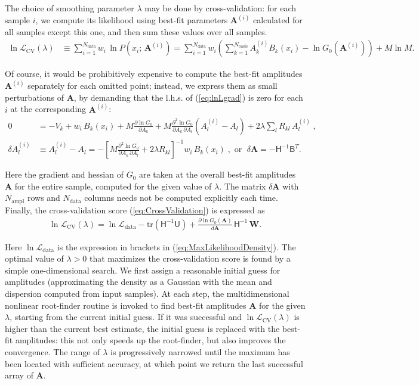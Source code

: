 \documentclass[12pt]{article}
\renewcommand{\d}{\partial}
\newcommand{\bA}{\boldsymbol{A}}
\begin{document}
The choice of smoothing parameter $\lambda$ may be done by cross-validation: for each sample $i$, we compute its likelihood using best-fit parameters $\bA^{(i)}$ calculated for all samples except this one, and then sum these values over all samples. 
\begin{align}  \label{eq:CrossValidation}
\ln\mathcal{L}_\mathrm{CV}(\lambda) &\equiv \sum_{i=1}^{N_\mathrm{data}} w_i \, \ln P(x_i;\, \bA^{(i)}) =
\sum_{i=1}^{N_\mathrm{data}} w_i \left(\sum_{k=1}^{N_\mathrm{basis}} A_k^{(i)} B_k(x_i) - \ln G_0(\bA^{(i)}) \right) + M\ln M.
\end{align}

Of course, it would be prohibitively expensive to compute the best-fit amplitudes $\bA^{(i)}$ separately for each omitted point; instead, we express them as small perturbations of $\bA$, by demanding that the l.h.s. of (\ref{eq:lnLgrad}) is zero for each $i$ at the corresponding $\bA^{(i)}$:
\begin{align*}
0 &= -V_k + w_i\,B_k(x_i) + M \frac{\d \ln G_0}{\d A_k} + M \frac{\d^2 \ln G_0}{\d A_k\,\d A_l}(A_l^{(i)}-A_l) + 2\lambda \sum_l R_{kl}\,A_l^{(i)} \;, \\
\delta A^{(i)}_l &\equiv A^{(i)}_l - A_l = - \left[ M \frac{\d^2 \ln G_0}{\d A_k\,\d A_l} + 2\lambda R_{kl} \right]^{-1} w_i\,B_k(x_i) \;,\mbox{ or }\;
\delta \bA = -\mathsf{H}^{-1} \mathsf{B}^T .
\end{align*}

Here the gradient and hessian of $G_0$ are taken at the overall best-fit amplitudes $\bA$ for the entire sample, computed for the given value of $\lambda$. The matrix $\delta \bA$ with $N_\mathrm{ampl}$ rows and $N_\mathrm{data}$ columns needs not be computed explicitly each time. Finally, the cross-validation score (\ref{eq:CrossValidation}) is expressed as
\begin{align}  \label{eq:CrossValidation2}
\ln\mathcal{L}_\mathrm{CV}(\lambda) = \ln\mathcal{L}_\mathrm{data}
- \mathrm{tr}(\mathsf{H}^{-1}\mathsf{U}) + \frac{\d\ln G_0(\bA)}{d\bA}\, \mathsf{H}^{-1}\, \boldsymbol{W} .
\end{align}

Here $\ln\mathcal{L}_\mathrm{data}$ is the expression in brackets in (\ref{eq:MaxLikelihoodDensity}). The optimal value of $\lambda>0$ that maximizes the cross-validation score is found by a simple one-dimensional search. We first assign a reasonable initial guess for amplitudes (approximating the density as a Gaussian with the mean and dispersion computed from input samples). At each step, the multidimensional nonlinear root-finder routine is invoked to find best-fit amplitudes $\bA$ for the given $\lambda$, starting from the current initial guess. If it was successful and $\ln\mathcal{L}_\mathrm{CV}(\lambda)$ is higher than the current best estimate, the initial guess is replaced with the best-fit amplitudes: this not only speeds up the root-finder, but also improves the convergence. The range of $\lambda$ is progressively narrowed until the maximum has been located with sufficient accuracy, at which point we return the last successful array of $\bA$. 
\end{document}
